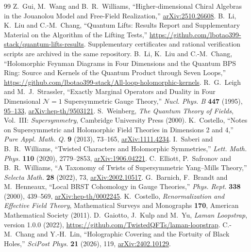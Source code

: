 \documentclass[11pt]{article}
\numberwithin{equation}{section}
\numberwithin{figure}{section}
\numberwithin{table}{section}
\begin{document}
\begin{thebibliography}{99}
Z.~Gui, M.~Wang and B.~R.~Williams, ``Higher-dimensional Chiral Algebras in the Jouanolou Model and Free-Field Realization,'' \href{https://arxiv.org/abs/2510.26608}{arXiv:2510.26608}.
B.~Li, K.~Liu and C.-M.~Chang, ``Quantum Lifts: Results Report and Supplementary Material on the Algorithm of the Lifting Tests,'' \url{https://github.com/lbotao399-stack/quantum-lifts-results}. Supplementary certificates and rational verification scripts are archived in the same repository.
B.~Li, K.~Liu and C.-M.~Chang, ``Holomorphic Feynman Diagrams in Four Dimensions and the Quantum BPS Ring: Source and Kernels of the Quantum Product through Seven Loops,'' \url{https://github.com/lbotao399-stack/All-loop-holomorphic-kernels}.
R.~G.~Leigh and M.~J.~Strassler, ``Exactly Marginal Operators and Duality in Four Dimensional $\mathcal N=1$ Supersymmetric Gauge Theory,'' \emph{Nucl. Phys. B} \textbf{447} (1995), \href{https://doi.org/10.1016/0550-3213(95)00261-P}{95--133}, \href{https://arxiv.org/abs/hep-th/9503121}{arXiv:hep-th/9503121}.
S.~Weinberg, \emph{The Quantum Theory of Fields}, Vol.~III: \emph{Supersymmetry}, Cambridge University Press (2000).
K.~Costello, ``Notes on Supersymmetric and Holomorphic Field Theories in Dimensions 2 and 4,'' \emph{Pure Appl. Math. Q.} \textbf{9} (2013), 73--165, \href{https://arxiv.org/abs/1111.4234}{arXiv:1111.4234}.
I.~Saberi and B.~R.~Williams, ``Twisted Characters and Holomorphic Symmetries,'' \emph{Lett. Math. Phys.} \textbf{110} (2020), 2779--2853, \href{https://arxiv.org/abs/1906.04221}{arXiv:1906.04221}.
C.~Elliott, P.~Safronov and B.~R.~Williams, ``A Taxonomy of Twists of Supersymmetric Yang--Mills Theory,'' \emph{Selecta Math.} \textbf{28} (2022), 73, \href{https://arxiv.org/abs/2002.10517}{arXiv:2002.10517}.
G.~Barnich, F.~Brandt and M.~Henneaux, ``Local BRST Cohomology in Gauge Theories,'' \emph{Phys. Rept.} \textbf{338} (2000), 439--569, \href{https://arxiv.org/abs/hep-th/0002245}{arXiv:hep-th/0002245}.
K.~Costello, \emph{Renormalization and Effective Field Theory}, Mathematical Surveys and Monographs \textbf{170}, American Mathematical Society (2011).
D.~Gaiotto, J.~Kulp and M.~Yu, \emph{Laman Loopstrap}, version 1.0.0 (2022), \url{https://github.com/TwistedQFTs/laman-loopstrap}.
C.-M.~Chang and Y.-H.~Lin, ``Holographic Covering and the Fortuity of Black Holes,'' \emph{SciPost Phys.} \textbf{21} (2026), 119, \href{https://arxiv.org/abs/2402.10129}{arXiv:2402.10129}.

\end{thebibliography}
\end{document}
